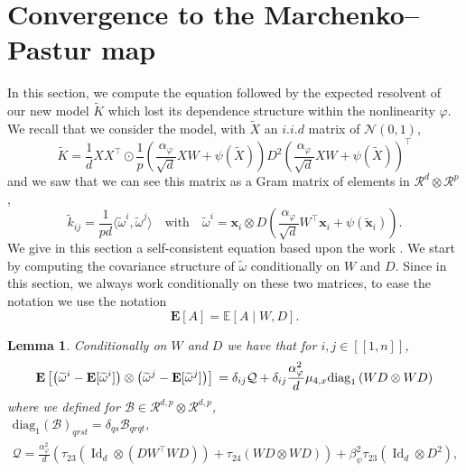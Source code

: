 \documentclass[letterpaper, 10pt, dvipsnames]{article}
\numberwithin{equation}{section}
\DeclareMathOperator{\Id}{Id}
\newcommand{\B}{\mathcal{B}}
\newcommand{\Q}{\mathcal{Q}}
\newcommand{\R}{\mathcal{R}}
\newcommand{\x}{\mathbf{x}}
\renewcommand{\phi}{\varphi}
\newcommand{\wt}{\widetilde}
\newcommand{\E}{\mathds{E}}
\newcommand{\unn}[2]{[\![#1,#2]\!]}
\newtheorem{lem}[ccounter]{Lemma}
\theoremstyle{definition}
\begin{document}
\section{Convergence to the Marchenko--Pastur map}\label{sec:baizhou}
In this section, we compute the equation followed by the expected resolvent of our new model $\wt{K}$ which lost its dependence structure within the nonlinearity $\phi$. We recall that we consider the model, with $\wt{X}$ an $i.i.d$ matrix of $\mathcal{N}(0,1)$, 
\[
  \wt{K}=\frac{1}{d}XX^\top \odot \frac{1}{p}\left(
    \frac{\alpha_\phi}{\sqrt{d}}XW + \psi(\wt{X})
  \right)D^2
  \left(
    \frac{\alpha_\phi}{\sqrt{d}}XW + \psi(\wt{X})
  \right)^\top 
\]
and we saw that we can see this matrix as a Gram matrix of elements in $\R^d\otimes \R^p$,
\[
\wt{k}_{ij} = \frac{1}{pd}\langle \wt{\omega}^i,\wt{\omega}^j\rangle
\quad\text{with}\quad 
\wt{\omega}^i=\x_i\otimes D\left(
  \frac{\alpha_\phi}{\sqrt{d}}W^\top \x_i + \psi(\wt{\x}_i)
\right).  
\]
We give in this section a self-consistent equation based upon the work \cite{baizhou}.
We start by computing the covariance structure of $\wt{\omega}$ conditionally on $W$ and $D$. Since in this section, we always work conditionally on these two matrices, to ease the notation we use the notation 
\[
\mathbf{E}[A] = \E\left[
  A\middle\vert W,D 
\right].  
\]
\begin{lem}\label{lem:covcomp}
Conditionally on $W$ and $D$ we have that for $i,j\in\unn{1}{n}$,
\begin{equation*}
\mathbf{E}\left[
  \left(
    \wt{\omega}^i-\mathbf{E}[\wt{\omega}^i]
  \right)\otimes 
  \left(
    \wt{\omega}^j-\mathbf{E}[\wt{\omega}^j]
  \right)
\right] \\
=
\delta_{ij}\mathcal{Q}
+
\delta_{ij}
\frac{\alpha_\phi^2}{d}\mu_{4,x}\mathrm{diag}_1\left(
  WD\otimes WD
  \right)
\end{equation*}
where we defined for $\B\in\R^{d,p}\otimes \R^{d,p}$,
\[
  \begin{gathered}
\mathrm{diag}_1(\B)_{qrst} = \delta_{qs}\B_{qrqt},\\
\Q = \frac{\alpha_\phi^2}{d}
\left(
  \tau_{23}\left(
    \Id_d\otimes (DW^\top WD)
  \right)
  +
  \tau_{24}\left(
    WD\otimes WD
  \right)
\right)
+
\beta_\psi^2\tau_{23}\left(
  \Id_d\otimes D^2
\right),
  \end{gathered}  
\]
\end{lem}
\end{document}
